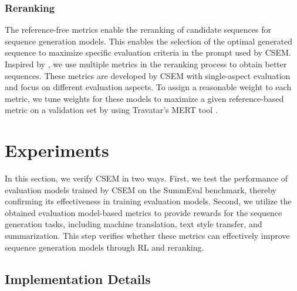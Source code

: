 \documentclass[lettersize,journal]{IEEEtran}
\begin{document}
\subsubsection{Reranking}
The reference-free metrics enable the reranking of candidate sequences for sequence generation models. This enables the selection of the optimal generated sequence to maximize specific evaluation criteria in the prompt used by CSEM. Inspired by \cite{fernandes2022quality}, we use multiple metrics in the reranking process to obtain better sequences. These metrics are developed by CSEM with single-aspect evaluation and focus on different evaluation aspects. To assign a reasonable weight to each metric, we tune weights for these models to maximize a given reference-based metric on a validation set by using Travatar's MERT tool \cite{neubig2013travatar}.


\section{Experiments}
In this section, we verify CSEM in two ways. First, we test the performance of evaluation models trained by CSEM on the SummEval benchmark, thereby confirming its effectiveness in training evaluation models.
Second, we utilize the obtained evaluation model-based metrics to provide rewards for the sequence generation tasks, including machine translation, text style transfer, and summarization. This step verifies whether these metrics can effectively improve sequence generation models through RL and reranking.







\subsection{Implementation Details}
\end{document}
